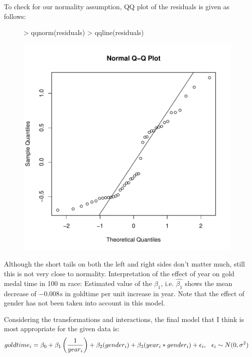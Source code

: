 \documentclass[12pt]{article}
\begin{document}
\clearpage
To check for our normality assumption, QQ plot of the residuals is given as follows:
\begin{figure}[H]
\begin{Schunk}
\begin{Sinput}
> qqnorm(residuals)
> qqline(residuals)
\end{Sinput}
\end{Schunk}
\includegraphics{HW4-012}
\end{figure}
Although the short tails on both the left and right sides don't matter much, still this is not very close to normality.
Interpretation of the effect of year on gold medal time in 100 m race: Estimated value of the $\beta_1$, i.e. $\hat{\beta_1}$ shows the mean decrease of $-0.008 s$ in goldtime per unit increase in year. Note that the effect of gender has not been taken into account in this model.

\item Considering the transformations and interactions, the final model that I think is most appropriate for the given data is:
\begin{equation*}
\begin{aligned}
goldtime_i=\beta_0 + \beta_1 \left(\dfrac{1}{year_i}\right) + \beta_2 (gender_i) + \beta_3 (year_i*gender_i) + \epsilon_i, \hspace{0.1in} \epsilon_i \sim N(0,\sigma^2)
\end{aligned}
\end{equation*}
\end{document}
